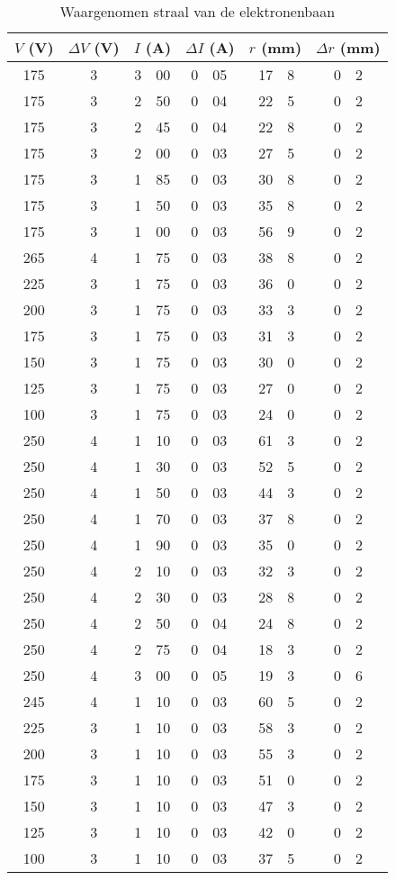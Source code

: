 \begin{table}
\caption{Waargenomen straal van de elektronenbaan}
\label{tabel-elektron}
\begin{center}
\begin{tabular}{c|c|r@{.}l|r@{.}l|r@{.}l|r@{.}l}
\multicolumn{1}{c|}{$V$ (V)}&
\multicolumn{1}{c|}{$\Delta V$ (V)}&
\multicolumn{2}{c|}{$I$ (A)}&
\multicolumn{2}{c|}{$\Delta I$ (A)}&
\multicolumn{2}{c|}{$r$ (mm)}&
\multicolumn{2}{c}{$\Delta r$ (mm)}\\\hline
175&	3&	3&00&	0&05&	17&8&	0&2\\
175&	3&	2&50&	0&04&	22&5&	0&2\\
175&	3&	2&45&	0&04&	22&8&	0&2\\
175&	3&	2&00&	0&03&	27&5&	0&2\\
175&	3&	1&85&	0&03&	30&8&	0&2\\
175&	3&	1&50&	0&03&	35&8&	0&2\\
175&	3&	1&00&	0&03&	56&9&	0&2\\\hline
265&	4&	1&75&	0&03&	38&8&	0&2\\
225&	3&	1&75&	0&03&	36&0&	0&2\\
200&	3&	1&75&	0&03&	33&3&	0&2\\
175&	3&	1&75&	0&03&	31&3&	0&2\\
150&	3&	1&75&	0&03&	30&0&	0&2\\
125&	3&	1&75&	0&03&	27&0&	0&2\\
100&	3&	1&75&	0&03&	24&0&	0&2\\\hline
250&	4&	1&10&	0&03&	61&3&	0&2\\
250&	4&	1&30&	0&03&	52&5&	0&2\\
250&	4&	1&50&	0&03&	44&3&	0&2\\
250&	4&	1&70&	0&03&	37&8&	0&2\\
250&	4&	1&90&	0&03&	35&0&	0&2\\
250&	4&	2&10&	0&03&	32&3&	0&2\\
250&	4&	2&30&	0&03&	28&8&	0&2\\
250&	4&	2&50&	0&04&	24&8&	0&2\\
250&	4&	2&75&	0&04&	18&3&	0&2\\
250&	4&	3&00&	0&05&	19&3&	0&6\\\hline
245&	4&	1&10&	0&03&	60&5&	0&2\\
225&	3&	1&10&	0&03&	58&3&	0&2\\
200&	3&	1&10&	0&03&	55&3&	0&2\\
175&	3&	1&10&	0&03&	51&0&	0&2\\
150&	3&	1&10&	0&03&	47&3&	0&2\\
125&	3&	1&10&	0&03&	42&0&	0&2\\
100&	3&	1&10&	0&03&	37&5&	0&2\\
\end{tabular}
\end{center}
\end{table}
